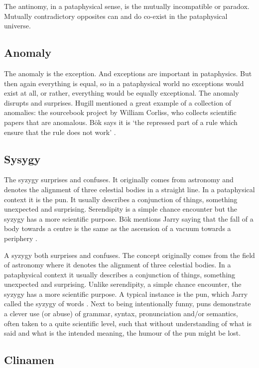 The antinomy, in a pataphysical sense, is the mutually incompatible or paradox. Mutually contradictory opposites can and do co-exist in the pataphysical universe.


\subsection{Anomaly}

The anomaly is the exception. And exceptions are important in pataphysics. But then again everything is equal, so in a pataphysical world no exceptions would exist at all, or rather, everything would be equally exceptional. The anomaly disrupts and surprises. Hugill mentioned a great example of a collection of anomalies: the sourcebook project by William Corliss, who collects scientific papers that are anomalous. Bök says it is `the repressed part of a rule which ensure that the rule does not work' \autocite[p.38]{Boek2002}.


\subsection{Sysygy}

The syzygy surprises and confuses. It originally comes from astronomy and denotes the alignment of three celestial bodies in a straight line. In a pataphysical context it is the pun. It usually describes a conjunction of things, something unexpected and surprising. Serendipity is a simple chance encounter but the syzygy has a more scientific purpose. Bök mentions Jarry saying that the fall of a body towards a centre is the same as the ascension of a vacuum towards a periphery \autocite[p.42]{Boek2002}.

A syzygy both surprises and confuses. The concept originally comes from the field of astronomy where it denotes the alignment of three celestial bodies. In a pataphysical context it usually describes a conjunction of things, something unexpected and surprising. Unlike serendipity, a simple chance encounter, the syzygy has a more scientific purpose. A typical instance is the pun, which Jarry called the syzygy of words \autocite{Jarry1996}. Next to being intentionally funny, puns demonstrate a clever use (or abuse) of grammar, syntax, pronunciation and/or semantics, often taken to a quite scientific level, such that without understanding of what is said and what is the intended meaning, the humour of the pun might be lost.


\subsection{Clinamen}

